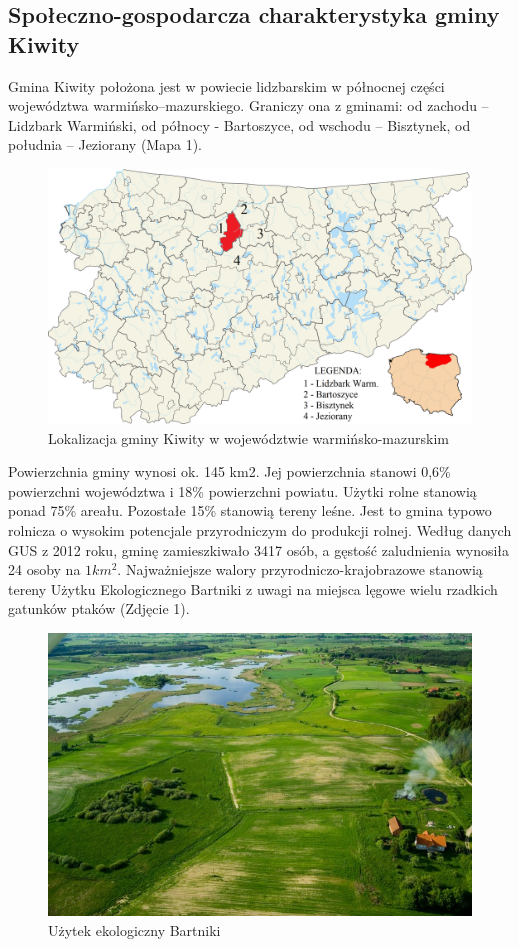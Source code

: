 \documentclass[a4paper,10pt]{article}
\begin{document}
  \subsection{Społeczno-gospodarcza charakterystyka gminy Kiwity}
    Gmina Kiwity położona jest w powiecie lidzbarskim w północnej części  województwa warmińsko–mazurskiego. 
    Graniczy ona z gminami: od zachodu –Lidzbark Warmiński, od północy - Bartoszyce, od wschodu – Bisztynek, od południa – Jeziorany (Mapa 1).
    \begin{figure}[!htb]
    \centering
	\includegraphics[scale=0.12]{pics/mapa1.png}
	\caption{Lokalizacja gminy Kiwity w województwie warmińsko-mazurskim}
    \end{figure}
    Powierzchnia gminy wynosi ok. 145 km2. Jej powierzchnia stanowi 0,6\% powierzchni województwa i 18\% powierzchni powiatu. Użytki rolne stanowią ponad 75\% areału. 
    Pozostałe 15\% stanowią tereny leśne. Jest to gmina typowo rolnicza o wysokim potencjale przyrodniczym do produkcji rolnej.
    Według danych GUS z 2012 roku, gminę zamieszkiwało 3417 osób, a gęstość zaludnienia wynosiła 24 osoby na $1 km^{2}$.
    Najważniejsze walory przyrodniczo-krajobrazowe stanowią tereny Użytku Ekologicznego Bartniki z uwagi na miejsca lęgowe wielu rzadkich gatunków ptaków (Zdjęcie 1).
    \begin{figure}[!htb]
    \centering
	\includegraphics{pics/zdjecie1.jpg}
	\caption{Użytek ekologiczny Bartniki}
    \end{figure}
    
\end{document}
